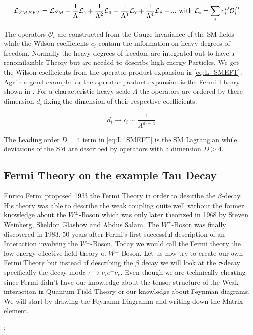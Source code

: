 \documentclass[../Bachelorarbeit.tex]{subfiles}
\begin{document}
\begin{equation}
    \mathcal{L}_{SMEFT} = \mathcal{L}_{SM} + \frac{1}{\Lambda} \mathcal{L}_{5} + \frac{1}{\Lambda^2} \mathcal{L}_{6} + \frac{1}{\Lambda^3} \mathcal{L}_{7} + \frac{1}{\Lambda^4} \mathcal{L}_{8} + ... \textnormal{ with } \mathcal{L}_{i} = \sum_{i} c_{i}^{D} \mathcal{O}_{i}^{D}
    \label{eq:L_SMEFT}
\end{equation}

The operators $\mathcal{O}_{i}$ are constructed from the Gauge invariance of the SM fields while the Wilson coefficients $c_{i}$ contain the information on heavy degrees of freedom.
Normally the heavy degrees of freedom are integrated out to have a renomilazible Theory but are needed to describe high energy Particles.
We get the Wilson coefficients from the operator product expansion in \ref{eq:L_SMEFT}. Again a good example for the operator product expansion is the Fermi Theory shown in \cite{Pich.1998}.
For a characteristic heavy scale $\Lambda$ the operators are ordered by there dimension $d_{i}$ fixing the dimension of their respective coefficients.

\begin{equation}
    [\mathcal{O}_i] = d_{i} \longrightarrow c_{i} \sim \frac{1}{\Lambda^{d_{i}-4}}
\end{equation}

The Leading order $D = 4$ term in \ref{eq:L_SMEFT} is the SM Lagrangian while deviations of the SM are described by operators with a dimension $D>4$.

\subsection{Fermi Theory on the example Tau Decay}
Enrico Fermi proposed 1933 the Fermi Theory in order to describe the $\beta$-decay. His theory was able to describe the
weak coupling quite well without the former knowledge about the $W^{\pm}$-Boson which was only later theorized in 1968 by Steven Weinberg, Sheldon Glashow and Abdus Salam.
The $W^{\pm}$-Boson was finally discovered in 1983. 50 years after Fermi's first successful description of an Interaction involving the $W^{\pm}$-Boson.
Today we would call the Fermi theory the low-energy effective field theory of $W^{\pm}$-Boson.
Let us now try to create our own Fermi Theory but instead of describing the $\beta$ decay we will look at the $\tau$-decay specifically the decay mode $\tau \rightarrow \nu_{\tau}e^{-}\nu_{e}$.
Even though we are technically cheating since Fermi didn't have our knowledge about the tensor structure of the Weak interaction in Quantum Field Theory or our knowledge about Feynman diagrams.
We will start by drawing the Feynamn Diagramm and writing down the Matrix element.
\begin{center}
    ;
\end{center}
\end{document}
